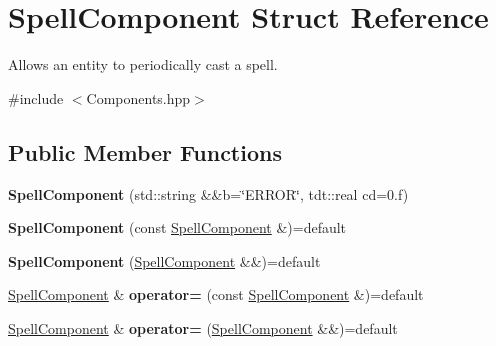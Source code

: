 \hypertarget{struct_spell_component}{}\section{Spell\+Component Struct Reference}
\label{struct_spell_component}


Allows an entity to periodically cast a spell.  




{\ttfamily \#include $<$Components.\+hpp$>$}

\subsection*{Public Member Functions}
\begin{DoxyCompactItemize}
\item 
{\bfseries Spell\+Component} (std\+::string \&\&b=\char`\"{}E\+R\+R\+OR\char`\"{}, tdt\+::real cd=0.f)\hypertarget{struct_spell_component_aa3116e6a22bee9171a7f8457b2aee7d6}{}\label{struct_spell_component_aa3116e6a22bee9171a7f8457b2aee7d6}

\item 
{\bfseries Spell\+Component} (const \hyperlink{struct_spell_component}{Spell\+Component} \&)=default\hypertarget{struct_spell_component_a94388b3be342e62032dadca4f7295d24}{}\label{struct_spell_component_a94388b3be342e62032dadca4f7295d24}

\item 
{\bfseries Spell\+Component} (\hyperlink{struct_spell_component}{Spell\+Component} \&\&)=default\hypertarget{struct_spell_component_a116938e539ae883ac408c2425a5535c8}{}\label{struct_spell_component_a116938e539ae883ac408c2425a5535c8}

\item 
\hyperlink{struct_spell_component}{Spell\+Component} \& {\bfseries operator=} (const \hyperlink{struct_spell_component}{Spell\+Component} \&)=default\hypertarget{struct_spell_component_a98b185f74b044ac0e6a42547c421506e}{}\label{struct_spell_component_a98b185f74b044ac0e6a42547c421506e}

\item 
\hyperlink{struct_spell_component}{Spell\+Component} \& {\bfseries operator=} (\hyperlink{struct_spell_component}{Spell\+Component} \&\&)=default\hypertarget{struct_spell_component_a6ddd65b933d79544d396c8dd0652de05}{}\label{struct_spell_component_a6ddd65b933d79544d396c8dd0652de05}

\end{DoxyCompactItemize}
